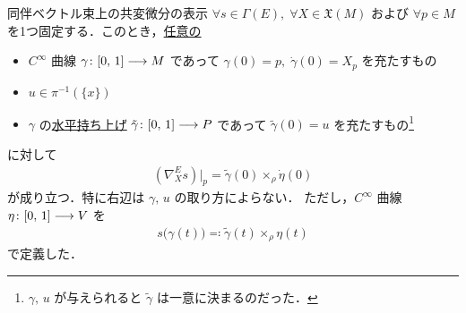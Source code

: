 \documentclass[geometry_main]{subfiles}
\begin{document}
\begin{mytheo}[label=thm:codv-assoc-HL]{同伴ベクトル束上の共変微分の表示}
    $\forall s \in \Gamma(E),\; \forall X \in \mathfrak{X}(M)$ および $\forall p \in M$ を1つ固定する．このとき，\underline{任意の}
    \begin{itemize}
        \item $C^\infty$ 曲線 $\gamma \colon [0,\, 1] \longrightarrow M$ であって $\gamma(0) = p,\; \dot{\gamma}(0) = X_p$ を充たすもの
        \item $u \in \pi^{-1}(\{x\})$
        \item $\gamma$ の\hyperref[def:horizontal-lift-curve]{水平持ち上げ} $\tilde{\gamma} \colon [0,\, 1] \longrightarrow P$ であって $\tilde{\gamma}(0) = u$ を充たすもの\footnote{$\gamma,\, u$ が与えられると $\tilde{\gamma}$ は一意に決まるのだった．}
    \end{itemize}
    に対して
    \begin{align}
        (\nabla^E_X s)|_p = \tilde{\gamma}(0) \times_\rho \dot{\eta}(0)
    \end{align}
    が成り立つ．特に右辺は $\gamma,\, u$ の取り方によらない．
    ただし，$C^\infty$ 曲線 $\eta \colon [0,\, 1] \longrightarrow V$ を
    \begin{align}
        s \bigl( \gamma(t) \bigr) \eqqcolon \tilde{\gamma}(t) \times_\rho \eta(t)
    \end{align}
    で定義した．
\end{mytheo}
\end{document}

